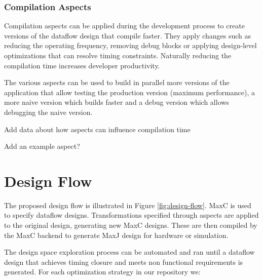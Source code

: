 \subsubsection{Compilation Aspects}

Compilation aspects can be applied during the development process to
create versions of the dataflow design that compile faster. They apply
changes such as reducing the operating frequency, removing debug
blocks or applying design-level optimizations that can resolve timing
constraints. Naturally reducing the compilation time increases
developer productivity.

The various aspects can be used to build in parallel more versions of
the application that allow testing the production version (maximum
performance), a more naive version which builds faster and a debug
version which allows debugging the naive version.

\TODO Add data about how aspects can influence compilation time

\TODO Add an example aspect?


\section{Design Flow}

The proposed design flow is illustrated in Figure
\ref{fig:design-flow}. MaxC is used to specify dataflow
designs. Transformations specified through aspects are applied to the
original design, generating new MaxC designs. These are then compiled
by the MaxC backend to generate MaxJ design for hardware or
simulation.

The design space exploration process can be automated and ran until a
dataflow design that achieves timing closure and meets non functional
requirements is generated.  For each optimization strategy in our
repository we:

